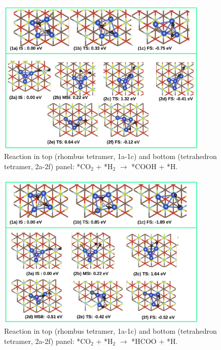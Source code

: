 \begin{figure}
  \begin{center}
    \includegraphics[width=0.9\textwidth]{./Appendix3/figures_si/p_106.jpg}
  \end{center}
    \caption{Reaction in top (rhombus tetramer, 1a-1c) and bottom (tetrahedron tetramer, 2a-2f) panel: *CO$_2$ + *H$_2$ $\rightarrow$ *COOH + *H.   }
  \label{fig:si-106}
\end{figure}

\begin{figure}
  \begin{center}
    \includegraphics[width=0.9\textwidth]{./Appendix3/figures_si/p_107.jpg}
  \end{center}
    \caption{ Reaction in top (rhombus tetramer, 1a-1c) and bottom (tetrahedron tetramer, 2a-2f) panel: *CO$_2$ + *H$_2$ $\rightarrow$ *HCOO + *H.  }
  \label{fig:si-107}
\end{figure}

